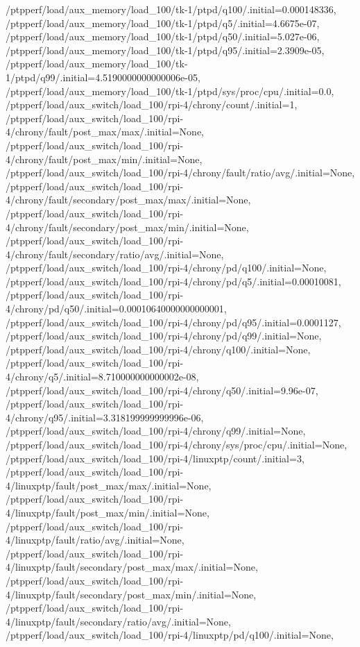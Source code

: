 {    /ptpperf/load/aux_memory/load_100/tk-1/ptpd/q100/.initial=0.000148336,
    /ptpperf/load/aux_memory/load_100/tk-1/ptpd/q5/.initial=4.6675e-07,
    /ptpperf/load/aux_memory/load_100/tk-1/ptpd/q50/.initial=5.027e-06,
    /ptpperf/load/aux_memory/load_100/tk-1/ptpd/q95/.initial=2.3909e-05,
    /ptpperf/load/aux_memory/load_100/tk-1/ptpd/q99/.initial=4.5190000000000006e-05,
    /ptpperf/load/aux_memory/load_100/tk-1/ptpd/sys/proc/cpu/.initial=0.0,
    /ptpperf/load/aux_switch/load_100/rpi-4/chrony/count/.initial=1,
    /ptpperf/load/aux_switch/load_100/rpi-4/chrony/fault/post_max/max/.initial=None,
    /ptpperf/load/aux_switch/load_100/rpi-4/chrony/fault/post_max/min/.initial=None,
    /ptpperf/load/aux_switch/load_100/rpi-4/chrony/fault/ratio/avg/.initial=None,
    /ptpperf/load/aux_switch/load_100/rpi-4/chrony/fault/secondary/post_max/max/.initial=None,
    /ptpperf/load/aux_switch/load_100/rpi-4/chrony/fault/secondary/post_max/min/.initial=None,
    /ptpperf/load/aux_switch/load_100/rpi-4/chrony/fault/secondary/ratio/avg/.initial=None,
    /ptpperf/load/aux_switch/load_100/rpi-4/chrony/pd/q100/.initial=None,
    /ptpperf/load/aux_switch/load_100/rpi-4/chrony/pd/q5/.initial=0.00010081,
    /ptpperf/load/aux_switch/load_100/rpi-4/chrony/pd/q50/.initial=0.00010640000000000001,
    /ptpperf/load/aux_switch/load_100/rpi-4/chrony/pd/q95/.initial=0.0001127,
    /ptpperf/load/aux_switch/load_100/rpi-4/chrony/pd/q99/.initial=None,
    /ptpperf/load/aux_switch/load_100/rpi-4/chrony/q100/.initial=None,
    /ptpperf/load/aux_switch/load_100/rpi-4/chrony/q5/.initial=8.710000000000002e-08,
    /ptpperf/load/aux_switch/load_100/rpi-4/chrony/q50/.initial=9.96e-07,
    /ptpperf/load/aux_switch/load_100/rpi-4/chrony/q95/.initial=3.318199999999996e-06,
    /ptpperf/load/aux_switch/load_100/rpi-4/chrony/q99/.initial=None,
    /ptpperf/load/aux_switch/load_100/rpi-4/chrony/sys/proc/cpu/.initial=None,
    /ptpperf/load/aux_switch/load_100/rpi-4/linuxptp/count/.initial=3,
    /ptpperf/load/aux_switch/load_100/rpi-4/linuxptp/fault/post_max/max/.initial=None,
    /ptpperf/load/aux_switch/load_100/rpi-4/linuxptp/fault/post_max/min/.initial=None,
    /ptpperf/load/aux_switch/load_100/rpi-4/linuxptp/fault/ratio/avg/.initial=None,
    /ptpperf/load/aux_switch/load_100/rpi-4/linuxptp/fault/secondary/post_max/max/.initial=None,
    /ptpperf/load/aux_switch/load_100/rpi-4/linuxptp/fault/secondary/post_max/min/.initial=None,
    /ptpperf/load/aux_switch/load_100/rpi-4/linuxptp/fault/secondary/ratio/avg/.initial=None,
    /ptpperf/load/aux_switch/load_100/rpi-4/linuxptp/pd/q100/.initial=None,
}
